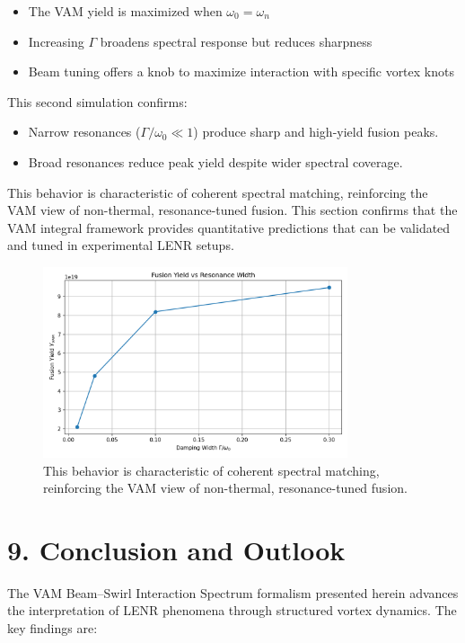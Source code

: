 \begin{itemize}
  \item The VAM yield is maximized when $\omega_0 = \omega_n$
  \item Increasing $\Gamma$ broadens spectral response but reduces sharpness
  \item Beam tuning offers a knob to maximize interaction with specific vortex knots
\end{itemize}

This second simulation confirms:
\begin{itemize}
  \item Narrow resonances ($\Gamma / \omega_0 \ll 1$) produce sharp and high-yield fusion peaks.
  \item Broad resonances reduce peak yield despite wider spectral coverage.
\end{itemize}

This behavior is characteristic of coherent spectral matching, reinforcing the VAM view of non-thermal, resonance-tuned fusion. This section confirms that the VAM integral framework provides quantitative predictions that can be validated and tuned in experimental LENR setups.


\begin{figure}[h!]
  \centering
  \includegraphics[width=0.8\textwidth]{../images/Appendix_BeamSwirlInteractionSpectrumImage7}
  \caption{This behavior is characteristic of coherent spectral matching, reinforcing the VAM view of non-thermal, resonance-tuned fusion.}
\end{figure}

\section*{9. Conclusion and Outlook}

The VAM Beam--Swirl Interaction Spectrum formalism presented herein advances the interpretation of LENR phenomena through structured vortex dynamics. The key findings are:

